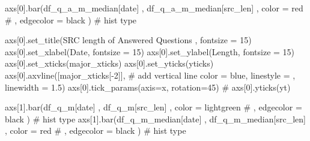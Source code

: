 \documentclass[
  letterpaper,
  DIV=11,
  numbers=noendperiod]{scrartcl}
\newenvironment{Shaded}{\begin{snugshade}}{\end{snugshade}}
\newcommand{\CommentTok}[1]{\textcolor[rgb]{0.37,0.37,0.37}{#1}}
\newcommand{\DecValTok}[1]{\textcolor[rgb]{0.68,0.00,0.00}{#1}}
\newcommand{\FloatTok}[1]{\textcolor[rgb]{0.68,0.00,0.00}{#1}}
\newcommand{\NormalTok}[1]{\textcolor[rgb]{0.00,0.23,0.31}{#1}}
\newcommand{\OperatorTok}[1]{\textcolor[rgb]{0.37,0.37,0.37}{#1}}
\newcommand{\StringTok}[1]{\textcolor[rgb]{0.13,0.47,0.30}{#1}}
\begin{document}
\begin{Shaded}
\begin{Highlighting}[]
\NormalTok{axs[}\DecValTok{0}\NormalTok{].bar(df\_q\_a\_m\_median[}\StringTok{\textquotesingle{}date\textquotesingle{}}\NormalTok{]}
\NormalTok{        ,  df\_q\_a\_m\_median[}\StringTok{\textquotesingle{}src\_len\textquotesingle{}}\NormalTok{]}
\NormalTok{        ,  color }\OperatorTok{=} \StringTok{\textquotesingle{}red\textquotesingle{}}
        \CommentTok{\# ,  edgecolor = \textquotesingle{}black\textquotesingle{}}
\NormalTok{      ) }\CommentTok{\# hist type}

\NormalTok{axs[}\DecValTok{0}\NormalTok{].set\_title(}\StringTok{\textquotesingle{}SRC length of Answered Questions \textquotesingle{}}\NormalTok{, fontsize }\OperatorTok{=} \DecValTok{15}\NormalTok{)}
\NormalTok{axs[}\DecValTok{0}\NormalTok{].set\_xlabel(}\StringTok{\textquotesingle{}Date\textquotesingle{}}\NormalTok{, fontsize }\OperatorTok{=} \DecValTok{15}\NormalTok{)}
\NormalTok{axs[}\DecValTok{0}\NormalTok{].set\_ylabel(}\StringTok{\textquotesingle{}Length\textquotesingle{}}\NormalTok{, fontsize }\OperatorTok{=} \DecValTok{15}\NormalTok{)}
\NormalTok{axs[}\DecValTok{0}\NormalTok{].set\_xticks(major\_xticks)}
\NormalTok{axs[}\DecValTok{0}\NormalTok{].set\_yticks(yticks)}
\NormalTok{axs[}\DecValTok{0}\NormalTok{].axvline([major\_xticks[}\OperatorTok{{-}}\DecValTok{2}\NormalTok{]], }\CommentTok{\# add vertical line}
\NormalTok{           color }\OperatorTok{=} \StringTok{\textquotesingle{}blue\textquotesingle{}}\NormalTok{,}
\NormalTok{           linestyle }\OperatorTok{=} \StringTok{\textquotesingle{}{-}{-}\textquotesingle{}}\NormalTok{,}
\NormalTok{           linewidth }\OperatorTok{=} \FloatTok{1.5}\NormalTok{)}
\NormalTok{axs[}\DecValTok{0}\NormalTok{].tick\_params(axis}\OperatorTok{=}\StringTok{\textquotesingle{}x\textquotesingle{}}\NormalTok{, rotation}\OperatorTok{=}\DecValTok{45}\NormalTok{)}
\CommentTok{\# axs[0].yticks(yt)}

\NormalTok{axs[}\DecValTok{1}\NormalTok{].bar(df\_q\_m[}\StringTok{\textquotesingle{}date\textquotesingle{}}\NormalTok{]}
\NormalTok{        ,  df\_q\_m[}\StringTok{\textquotesingle{}src\_len\textquotesingle{}}\NormalTok{]}
\NormalTok{        ,  color }\OperatorTok{=} \StringTok{\textquotesingle{}lightgreen\textquotesingle{}}
        \CommentTok{\# ,  edgecolor = \textquotesingle{}black\textquotesingle{}}
\NormalTok{      ) }\CommentTok{\# hist type}
\NormalTok{axs[}\DecValTok{1}\NormalTok{].bar(df\_q\_m\_median[}\StringTok{\textquotesingle{}date\textquotesingle{}}\NormalTok{]}
\NormalTok{        ,  df\_q\_m\_median[}\StringTok{\textquotesingle{}src\_len\textquotesingle{}}\NormalTok{]}
\NormalTok{        ,  color }\OperatorTok{=} \StringTok{\textquotesingle{}red\textquotesingle{}}
        \CommentTok{\# ,  edgecolor = \textquotesingle{}black\textquotesingle{}}
\NormalTok{      ) }\CommentTok{\# hist type}


\end{Highlighting}
\end{Shaded}
\end{document}
